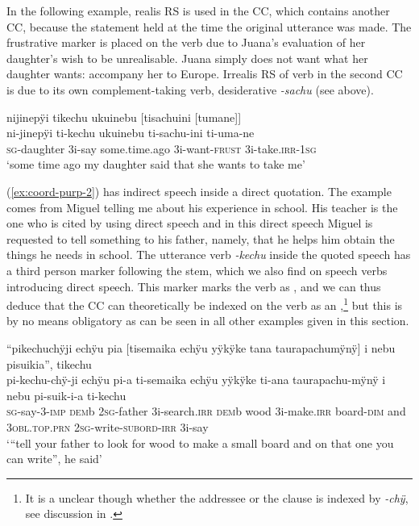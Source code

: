 In the following example, realis RS is used in the CC, which contains another CC, because the statement held at the time the original utterance was made. The frustrative marker is placed on the verb due to Juana’s evaluation of her daughter’s wish to be unrealisable. Juana simply does not want what her daughter wants: accompany her to Europe. Irrealis RS of verb in the second CC is due to its own complement-taking verb, desiderative \textit{-sachu} (see  above).

\ea\label{ex:say-rep-3}
\begingl
\glpreamble nijinepÿi tikechu ukuinebu \textup{[}tisachuini \textup{[}tumane\textup{]}\textup{]}\\
\gla ni-jinepÿi ti-kechu ukuinebu ti-sachu-ini ti-uma-ne\\
\textsc{sg}-daughter 3i-say some.time.ago 3i-want-\textsc{frust} 3i-take.\textsc{irr}-1\textsc{sg}\\
\glft ‘some time ago my daughter said that she wants to take me’
\endgl
\trailingcitation{[jxx-e120430l-4.44-45]}
\xe

(\ref{ex:coord-purp-2}) has indirect speech inside a direct quotation.
The example comes from Miguel telling me about his experience in school. His teacher is the one who is cited by using direct speech and in this direct speech Miguel is requested to tell something to his father, namely, that he helps him obtain the things he needs in school. The utterance verb \textit{-kechu} inside the quoted speech has a third person marker following the stem, which we also find on speech verbs introducing direct speech. This marker marks the verb as , and we can thus deduce that the CC can theoretically be indexed on the verb as an ,\footnote{It is a unclear though whether the addressee or the clause is indexed by \textit{-chÿ}, see discussion in .} but this is by no means obligatory as can be seen in all other examples given in this section.

\ea\label{ex:coord-purp-2}
\begingl
\glpreamble “pikechuchÿji echÿu pia \textup{[}tisemaika echÿu yÿkÿke tana taurapachumÿnÿ\textup{]} i nebu pisuikia”, tikechu\\
\gla pi-kechu-chÿ-ji echÿu pi-a ti-semaika echÿu yÿkÿke ti-ana taurapachu-mÿnÿ i nebu pi-suik-i-a ti-kechu\\
\textsc{sg}-say-3-\textsc{imp} \textsc{dem}b 2\textsc{sg}-father 3i-search.\textsc{irr} \textsc{dem}b wood 3i-make.\textsc{irr} board-\textsc{dim} and 3\textsc{obl.top.prn} 2\textsc{sg}-write-\textsc{subord}-\textsc{irr} 3i-say\\
\glft ‘“tell your father to look for wood to make a small board and on that one you can write”, he said’
\endgl
\trailingcitation{[mxx-p181027l-1.022]}
\xe
{}

